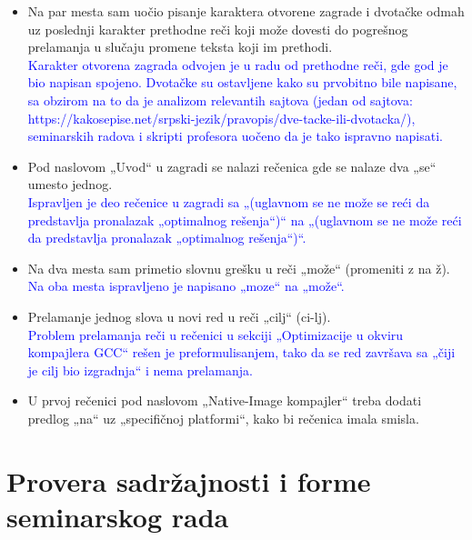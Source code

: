 \documentclass[a4paper]{report}
\newcommand{\odgovor}[1]{\textcolor{blue}{#1}}
\begin{document}
\begin{itemize}
    \item Na par mesta sam uočio pisanje karaktera otvorene zagrade i dvotačke odmah uz poslednji karakter prethodne reči koji može dovesti do pogrešnog prelamanja u slučaju promene teksta koji im prethodi.\\
         \odgovor{Karakter otvorena zagrada odvojen je u radu od prethodne reči, gde god je bio napisan spojeno. Dvotačke su ostavljene kako su prvobitno bile napisane, sa obzirom na to
                 da je analizom relevantih sajtova (jedan od sajtova: https://kakosepise.net/srpski-jezik/pravopis/dve-tacke-ili-dvotacka/), seminarskih radova i skripti profesora uočeno da je tako ispravno napisati.
         }  
    \item Pod naslovom „Uvod“ u zagradi se nalazi rečenica gde se nalaze dva „se“ umesto jednog. \\
    \odgovor{Ispravljen je deo rečenice u zagradi sa „(uglavnom se ne može  se reći da predstavlja pronalazak „optimalnog rešenja“)“ na  „(uglavnom se ne može reći da predstavlja pronalazak „optimalnog rešenja“)“. } 
    \item Na dva mesta sam primetio slovnu grešku u reči „može“ (promeniti z na ž). \\
    \odgovor{Na oba mesta ispravljeno je napisano „moze“  na „može“. }
    \item Prelamanje jednog slova u novi red u reči „cilj“ (ci-lj). \\
    \odgovor{Problem  prelamanja reči u rečenici u sekciji „Optimizacije u okviru kompajlera GCC“ rešen je preformulisanjem, tako da se red završava sa „čiji je cilj bio izgradnja“ i nema prelamanja. }
    \item U prvoj rečenici pod naslovom „Native-Image kompajler“ treba dodati predlog „na“ uz „specifičnoj platformi“, kako bi rečenica imala smisla.
\end{itemize}


\section{Provera sadržajnosti i forme seminarskog rada}
\end{document}

